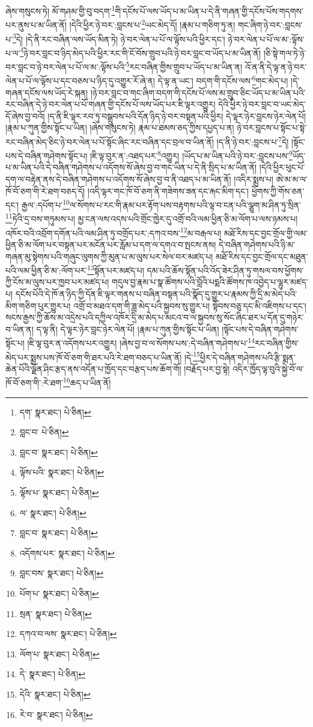 ཞེས་གསུངས་ཏེ། མོ་གཤམ་གྱི་བུ་བདག་\footnote{དག་  སྣར་ཐང་།  པེ་ཅིན། }གི་དངོས་པོ་ལས་ཡོད་པ་མ་ཡིན་པ་དེ་ནི་གཞན་གྱི་དངོས་པོས་གདགས་པར་ནུས་པ་མ་ཡིན་ནོ། །དེའི་ཕྱིར་ཉེ་བར་:བླངས་པ་\footnote{བླང་བ་  པེ་ཅིན། }ཡང་མེད་དོ། །རྣམ་པ་གཅིག་ཏུ་ན། གང་ཞིག་ཉེ་བར་:བླངས་པ་\footnote{བླང་བ་  སྣར་ཐང་།  པེ་ཅིན། }དེ། །དེ་ནི་རང་བཞིན་ལས་ཡོད་མིན་ཏེ། ཉེ་བར་ལེན་པ་པོ་ལ་ལྟོས་པའི་ཕྱིར་དང་། ཉེ་བར་ལེན་པ་པོ་ལ་མ་:ལྟོས་པ་ལ་\footnote{ལྟོས་པའི་  སྣར་ཐང་།  པེ་ཅིན། }ཉེ་བར་བླང་བ་ཉིད་མེད་པའི་ཕྱིར་རང་གི་ངོ་བོས་གྲུབ་པའི་ཉེ་བར་བླང་བ་ཡོད་པ་མ་ཡིན་ནོ། །ཅི་སྟེ་གལ་ཏེ་ཉེ་བར་བླང་བ་ཉེ་བར་ལེན་པ་པོ་ལ་མ་:ལྟོས་པའི་\footnote{ལྟོས་པ་  སྣར་ཐང་།  པེ་ཅིན། }རང་བཞིན་གྱིས་གྲུབ་པ་ཡོད་པ་མ་ཡིན་ན། འོ་ན་ནི་དེ་ལྟ་ན་ཉེ་བར་ལེན་པ་པོ་ལ་ལྟོས་པ་དང་བཅས་པ་ཉིད་དུ་འགྱུར་རོ་ཞེ་ན། དེ་ལྟ་ན་ཡང་། བདག་གི་དངོས་ལས་\footnote{ལ་  སྣར་ཐང་།  པེ་ཅིན། }གང་མེད་པ། །དེ་གཞན་དངོས་ལས་ཡོད་རེ་སྐན། །ཉེ་བར་བླང་བ་གང་ཞིག་བདག་གི་དངོས་པོ་ལས་མ་གྲུབ་ཅིང་ཡོད་པ་མ་ཡིན་པའི་རང་བཞིན་དེ་ཉེ་བར་ལེན་པ་པོ་གཞན་གྱི་དངོས་པོ་ལས་ཡོད་པར་ཇི་ལྟར་འགྱུར། དེའི་ཕྱིར་ཉེ་བར་བླང་བ་ཡང་མེད་དོ་ཞེས་བྱ་བའོ། །ད་ནི་ཇི་ལྟར་རབ་ཏུ་བསྒྲུབས་པའི་དོན་ཉིད་ཉེ་བར་བསྟན་པའི་ཕྱིར། དེ་ལྟར་ཉེར་བླངས་ཉེར་ལེན་པོ། །རྣམ་པ་ཀུན་གྱིས་སྟོང་པ་ཡིན། །ཞེས་གསུངས་ཏེ། རྣམ་པ་ཐམས་ཅད་ཀྱིས་དཔྱད་པ་ན། ཉེ་བར་བླངས་པ་སྟོང་པ་སྟེ་རང་བཞིན་མེད་ཅིང་ཉེ་བར་ལེན་པ་པོ་སྟོང་ཞིང་རང་བཞིན་དང་བྲལ་བ་ཡིན་ནོ། །ད་ནི་ཉེ་བར་:བླངས་པ་\footnote{བླང་བ་  སྣར་ཐང་།  པེ་ཅིན། }དེ། །སྟོང་པས་དེ་བཞིན་གཤེགས་སྟོང་པ། །ཇི་ལྟ་བུར་ན་:འཐད་པར་\footnote{འདོགས་པར་  སྣར་ཐང་།  པེ་ཅིན། }འགྱུར། །ཡོད་པ་མ་ཡིན་པའི་ཉེ་བར་:བླངས་པས་\footnote{བླང་བས་  སྣར་ཐང་།  པེ་ཅིན། }ཡོད་པ་མ་ཡིན་པའི་དེ་བཞིན་གཤེགས་པ་འདོགས་སོ་ཞེས་བྱ་བ་གང་ཡིན་པ་དེ་ནི་སྲིད་པ་མ་ཡིན་ནོ། །དེའི་ཕྱིར་ཕུང་པོ་དག་ལ་བརྟེན་ནས་དེ་བཞིན་གཤེགས་པ་འདོགས་སོ་ཞེས་བྱ་བ་ནི་འཐད་པ་མ་ཡིན་ནོ། །འདིར་སྨྲས་པ། ཨེ་མ་མ་ལ་ཁོ་བོ་ཅག་གི་རེ་ཐག་བཅད་དོ། །འདི་ལྟར་གང་ཁོ་བོ་ཅག་ནི་གཟེགས་ཟན་དང་རྐང་མིག་དང་། ཕྱོགས་ཀྱི་གོས་ཅན་དང་། རྒྱལ་:དཔོག་པ་\footnote{པོག་པ་  སྣར་ཐང་།  པེ་ཅིན། }ལ་སོགས་པ་རང་གི་རྣམ་པར་རྟོག་པས་བརྟགས་པའི་ལྟ་བ་ངན་པའི་ལྕུག་མ་ཤིན་ཏུ་སྲིན་\footnote{སྲན་  སྣར་ཐང་།  པེ་ཅིན། }ཏེའི་དྲ་བས་གཏུམས་པ། མྱ་ངན་ལས་འདས་པའི་གྲོང་ཁྱེར་དུ་འགྲོ་བའི་ལམ་ཕྱིན་ཅི་མ་ལོག་པ་ལས་ཉམས་པ། འཁོར་བའི་འབྲོག་དགོན་པའི་ལམ་ཤིན་ཏུ་བགྲོད་པར་:དཀའ་བས་\footnote{དཀའ་བ་ལས་  སྣར་ཐང་།  པེ་ཅིན། }མ་བརྒལ་པ། མཐོ་རིས་དང་བྱང་གྲོལ་གྱི་ལམ་ཕྱིན་ཅི་མ་ལོག་པར་བསྟན་པར་མངོན་པར་རློམ་པ་དག་ལ་དགའ་བ་སྤངས་ནས། དེ་བཞིན་གཤེགས་པའི་ཉི་མ་གཞན་མུ་སྟེགས་པའི་གཞུང་ལུགས་ཀྱི་མུན་པ་མ་ལུས་པར་སེལ་བར་མཛད་པ། མཐོ་རིས་དང་བྱང་གྲོལ་དང་མཐུན་པའི་ལམ་ཕྱིན་ཅི་མ་:ལོག་པར་\footnote{ལོག་པ་  སྣར་ཐང་།  པེ་ཅིན། }སྟོན་པར་མཛད་པ། དམ་པའི་ཆོས་སྟོན་པའི་འོད་ཟེར་ཤིན་ཏུ་གསལ་བས་ཕྱོགས་ཀྱི་ངོས་མ་ལུས་པར་ཁྱབ་པར་མཛད་པ། གདུལ་བྱ་རྣམ་པ་སྣ་ཚོགས་པའི་བློའི་པདྨའི་ཚོགས་ཁ་འབྱེད་པ་ལྷུར་མཛད་པ། དངོས་པོའི་དེ་ཁོ་ན་ཉིད་ཀྱི་དོན་ཇི་ལྟར་གནས་པ་བཞིན་བསྟན་པའི་སྣོད་དུ་གྱུར་པ་རྣམས་ཀྱི་དྲི་མ་མེད་པའི་མིག་གཅིག་པུར་གྱུར་པ། འགྲོ་བ་མཐའ་དག་གི་ཟླ་མེད་པའི་སྐྱབས་སུ་གྱུར་པ། སྟོབས་བཅུ་དང་མི་འཇིགས་པ་དང་། སངས་རྒྱས་ཀྱི་ཆོས་མ་འདྲེས་པའི་དཀྱིལ་འཁོར་དྲི་མ་མེད་པ་མངའ་བ་ལ་སྐྱབས་སུ་སོང་ཞིང་ཐར་པ་དོན་དུ་གཉེར་བ་ཡིན་ན། ད་ལྟ་ནི། དེ་ལྟར་ཉེར་བླང་ཉེར་ལེན་པོ། །རྣམ་པ་ཀུན་གྱིས་སྟོང་པ་ཡིན། །སྟོང་པས་དེ་བཞིན་གཤེགས་སྟོང་པ། །ཇི་ལྟ་བུར་ན་འདོགས་པར་འགྱུར། །ཞེས་བྱ་བ་ལ་སོགས་པས་:དེ་བཞིན་གཤེགས་པ་\footnote{དེ་  སྣར་ཐང་།  པེ་ཅིན། }རང་བཞིན་གྱིས་མེད་པར་སྨྲས་པས་ཁོ་བོ་ཅག་གི་ཐར་པའི་རེ་ཐག་བཅད་པ་ཡིན་ནོ། །དེ་\footnote{དེའི་  སྣར་ཐང་།  པེ་ཅིན། }ཕྱིར་དེ་བཞིན་གཤེགས་པའི་རྩི་སྨན་ཆེན་པོའི་ལྗོན་ཤིང་རྩད་ནས་འདོན་པ་ཁྱོད་དང་བརྩད་པས་ཆོག་གོ། །བརྗོད་པར་བྱ་སྟེ། འདིར་ཁྱོད་ལྟ་བུའི་སྐྱེ་བོ་ལ་ཁོ་བོ་ཅག་གི་:རེ་ཐག་\footnote{རེ་བ་  སྣར་ཐང་།  པེ་ཅིན། }ཆད་པ་ཡིན་ནོ། 